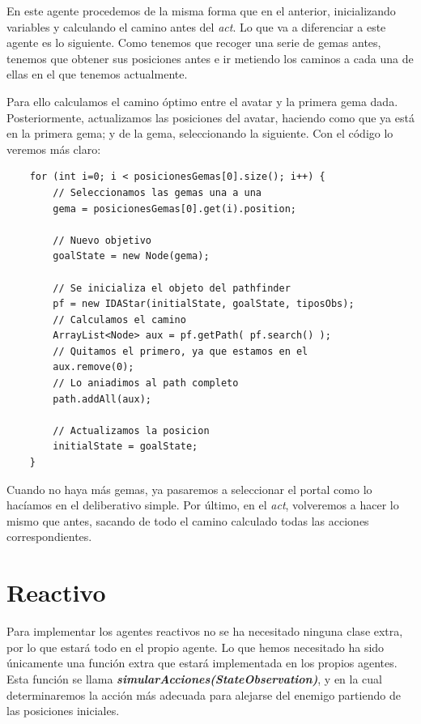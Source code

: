 \documentclass[11pt,a4paper]{article}
\begin{document}
En este agente procedemos de la misma forma que en el anterior, inicializando variables y calculando el camino
antes del \textit{act}. Lo que va a diferenciar a este agente es lo siguiente. Como tenemos que recoger una
serie de gemas antes, tenemos que obtener sus posiciones antes e ir metiendo los caminos a cada una de ellas en
el que tenemos actualmente.

Para ello calculamos el camino óptimo entre el avatar y la primera gema dada. Posteriormente, actualizamos
las posiciones del avatar, haciendo como que ya está en la primera gema; y de la gema, seleccionando la siguiente.
Con el código lo veremos más claro:
\newline
\begin{lstlisting}
    for (int i=0; i < posicionesGemas[0].size(); i++) {
        // Seleccionamos las gemas una a una
        gema = posicionesGemas[0].get(i).position;

        // Nuevo objetivo
        goalState = new Node(gema);
        
        // Se inicializa el objeto del pathfinder
        pf = new IDAStar(initialState, goalState, tiposObs);
        // Calculamos el camino
        ArrayList<Node> aux = pf.getPath( pf.search() );
        // Quitamos el primero, ya que estamos en el
        aux.remove(0);
        // Lo aniadimos al path completo
        path.addAll(aux);
        
        // Actualizamos la posicion
        initialState = goalState;
    }
\end{lstlisting}

Cuando no haya más gemas, ya pasaremos a seleccionar el portal como lo hacíamos en el deliberativo simple. Por
último, en el \textit{act}, volveremos a hacer lo mismo que antes, sacando de todo el camino calculado todas
las acciones correspondientes.




\newpage

\section{Reactivo}

Para implementar los agentes reactivos no se ha necesitado ninguna clase extra, por lo que estará todo en el
propio agente. Lo que hemos necesitado ha sido únicamente una función extra que estará implementada en los
propios agentes. Esta función se llama \textbf{\textit{simularAcciones(StateObservation)}}, y en la cual
determinaremos la acción más adecuada para alejarse del enemigo partiendo de las posiciones iniciales.
\end{document}
